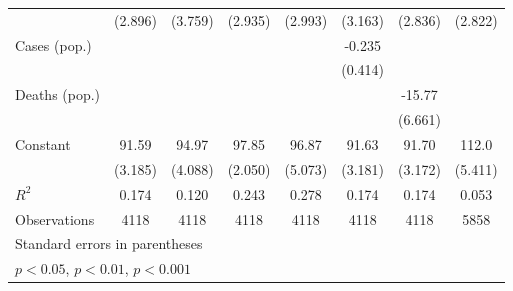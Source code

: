 \documentclass{article}
\begin{document}
{\begin{longtable}{l*{7}{c}}
                &  (2.896)         &  (3.759)         &  (2.935)         &  (2.993)         &  (3.163)         &  (2.836)         &  (2.822)         \\
Cases (pop.)    &                  &                  &                  &                  &   -0.235         &                  &                  \\
                &                  &                  &                  &                  &  (0.414)         &                  &                  \\
Deaths (pop.)   &                  &                  &                  &                  &                  &   -15.77\sym{*}  &                  \\
                &                  &                  &                  &                  &                  &  (6.661)         &                  \\
Constant        &    91.59\sym{***}&    94.97\sym{***}&    97.85\sym{***}&    96.87\sym{***}&    91.63\sym{***}&    91.70\sym{***}&    112.0\sym{***}\\
                &  (3.185)         &  (4.088)         &  (2.050)         &  (5.073)         &  (3.181)         &  (3.172)         &  (5.411)         \\
\hline
\(R^{2}\)       &    0.174         &    0.120         &    0.243         &    0.278         &    0.174         &    0.174         &    0.053         \\
Observations    &     4118         &     4118         &     4118         &     4118         &     4118         &     4118         &     5858         \\
\hline\hline
\multicolumn{8}{l}{\footnotesize Standard errors in parentheses}\\
\multicolumn{8}{l}{\footnotesize \sym{*} \(p<0.05\), \sym{**} \(p<0.01\), \sym{***} \(p<0.001\)}\\
\end{longtable}
}
\end{document}
